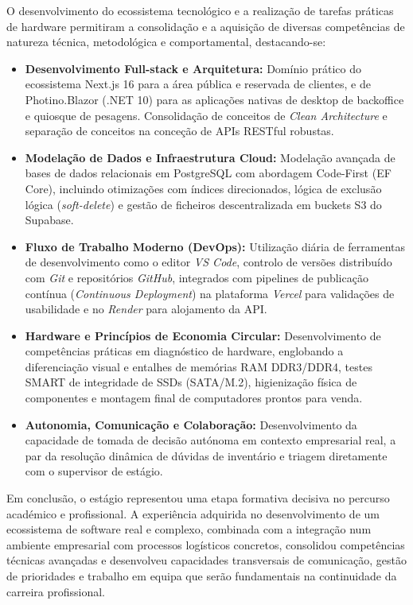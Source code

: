 O desenvolvimento do ecossistema tecnológico e a realização de tarefas práticas de hardware permitiram a consolidação e a aquisição de diversas competências de natureza técnica, metodológica e comportamental, destacando-se:
\begin{itemize}
    \item \textbf{Desenvolvimento Full-stack e Arquitetura:} Domínio prático do ecossistema Next.js 16 para a área pública e reservada de clientes, e de Photino.Blazor (.NET 10) para as aplicações nativas de desktop de backoffice e quiosque de pesagens. Consolidação de conceitos de \textit{Clean Architecture} e separação de conceitos na conceção de APIs RESTful robustas.
    \item \textbf{Modelação de Dados e Infraestrutura Cloud:} Modelação avançada de bases de dados relacionais em PostgreSQL com abordagem Code-First (EF Core), incluindo otimizações com índices direcionados, lógica de exclusão lógica (\textit{soft-delete}) e gestão de ficheiros descentralizada em buckets S3 do Supabase.
    \item \textbf{Fluxo de Trabalho Moderno (DevOps):} Utilização diária de ferramentas de desenvolvimento como o editor \textit{VS Code}, controlo de versões distribuído com \textit{Git} e repositórios \textit{GitHub}, integrados com pipelines de publicação contínua (\textit{Continuous Deployment}) na plataforma \textit{Vercel} para validações de usabilidade e no \textit{Render} para alojamento da API.
    \item \textbf{Hardware e Princípios de Economia Circular:} Desenvolvimento de competências práticas em diagnóstico de hardware, englobando a diferenciação visual e entalhes de memórias \ac{RAM} DDR3/DDR4, testes \ac{SMART} de integridade de \acp{SSD} (\ac{SATA}/M.2), higienização física de componentes e montagem final de computadores prontos para venda.
    \item \textbf{Autonomia, Comunicação e Colaboração:} Desenvolvimento da capacidade de tomada de decisão autónoma em contexto empresarial real, a par da resolução dinâmica de dúvidas de inventário e triagem diretamente com o supervisor de estágio.
\end{itemize}

Em conclusão, o estágio representou uma etapa formativa decisiva no percurso académico e profissional. A experiência adquirida no desenvolvimento de um ecossistema de software real e complexo, combinada com a integração num ambiente empresarial com processos logísticos concretos, consolidou competências técnicas avançadas e desenvolveu capacidades transversais de comunicação, gestão de prioridades e trabalho em equipa que serão fundamentais na continuidade da carreira profissional.
